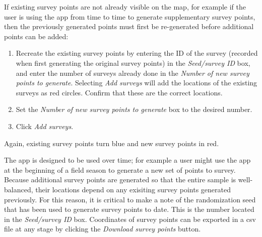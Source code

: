 \documentclass[a4paper,11pt]{article} %
\begin{document}
If existing survey points are not already visible on the map, for example if the user is using the app from time to time to generate supplementary survey points, then the previously generated points must first be re-generated before additional points can be added:
\begin{enumerate}
\item Recreate the existing survey points by entering the ID of the survey (recorded when first generating the original survey points) in the \textit{Seed/survey ID} box, and enter the number of surveys already done in the \textit{Number of new survey points to generate}. Selecting \textit{Add surveys} will add the locations of the existing surveys as red circles. Confirm that these are the correct locations.
\item Set the \textit{Number of new survey points to generate} box to the desired number.
\item Click \textit{Add surveys}. 
\end{enumerate}
Again, existing survey points turn blue and new survey points in red.

The app is designed to be used over time; for example a user might use the app at the beginning of a field season to generate a new set of points to survey. Because additional survey points are generated so that the entire sample is well-balanced, their locations depend on any exisiting survey points generated previously. For this reason, it is critical to make a note of the randomization seed that has been used to generate survey points to date. This is the number located in the \textit{Seed/survey ID} box. Coordinates of survey points can be exported in a csv file at any stage by clicking the \textit{Download survey points} button.



  
\end{document}
